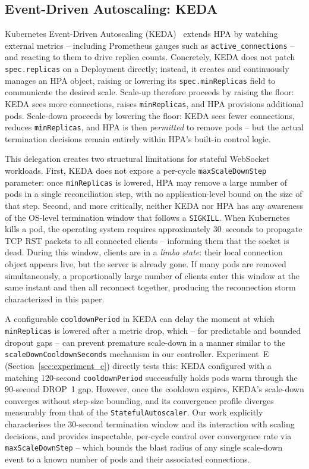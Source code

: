 \documentclass[twocolumn]{svjour3}
\begin{document}
\subsection{Event-Driven Autoscaling: KEDA}

Kubernetes Event-Driven Autoscaling (KEDA)~\cite{keda_docs} extends HPA by watching external metrics -- including Prometheus gauges such as \texttt{active\_connections} -- and reacting to them to drive replica counts. Concretely, KEDA does not patch \texttt{spec.replicas} on a Deployment directly; instead, it creates and continuously manages an HPA object, raising or lowering its \texttt{spec.minReplicas} field to communicate the desired scale. Scale-up therefore proceeds by raising the floor: KEDA sees more connections, raises \texttt{minReplicas}, and HPA provisions additional pods. Scale-down proceeds by lowering the floor: KEDA sees fewer connections, reduces \texttt{minReplicas}, and HPA is then \textit{permitted} to remove pods -- but the actual termination decisions remain entirely within HPA's built-in control logic.

This delegation creates two structural limitations for stateful WebSocket workloads. First, KEDA does not expose a per-cycle \texttt{maxScaleDownStep} parameter: once \texttt{minReplicas} is lowered, HPA may remove a large number of pods in a single reconciliation step, with no application-level bound on the size of that step. Second, and more critically, neither KEDA nor HPA has any awareness of the OS-level termination window that follows a \texttt{SIGKILL}. When Kubernetes kills a pod, the operating system requires approximately 30~seconds to propagate TCP RST packets to all connected clients -- informing them that the socket is dead. During this window, clients are in a \textit{limbo state}: their local connection object appears live, but the server is already gone. If many pods are removed simultaneously, a proportionally large number of clients enter this window at the same instant and then all reconnect together, producing the reconnection storm characterized in this paper.

A configurable \texttt{cooldownPeriod} in KEDA can delay the moment at which \texttt{minReplicas} is lowered after a metric drop, which -- for predictable and bounded dropout gaps -- can prevent premature scale-down in a manner similar to the \texttt{scaleDownCooldownSeconds} mechanism in our controller. Experiment~E (Section~\ref{sec:experiment_e}) directly tests this: KEDA configured with a matching 120-second \texttt{cooldownPeriod} successfully holds pods warm through the 90-second DROP~1 gap. However, once the cooldown expires, KEDA's scale-down converges without step-size bounding, and its convergence profile diverges measurably from that of the \texttt{StatefulAutoscaler}. Our work explicitly characterises the 30-second termination window and its interaction with scaling decisions, and provides inspectable, per-cycle control over convergence rate via \texttt{maxScaleDownStep} -- which bounds the blast radius of any single scale-down event to a known number of pods and their associated connections.
\end{document}
